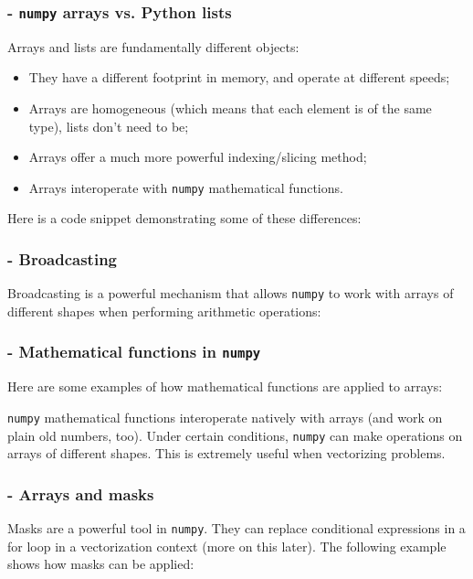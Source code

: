 \subsubsection{- \texttt{numpy} arrays vs. Python lists}
Arrays and lists are fundamentally different objects:
\begin{itemize}
    \item[-] They have a different footprint in memory, and operate at different speeds;
    \item[-] Arrays are homogeneous (which means that each element is of the same type), lists don't need to be;
    \item[-] Arrays offer a much more powerful indexing/slicing method;
    \item[-] Arrays interoperate with \texttt{numpy} mathematical functions.
\end{itemize}

Here is a code snippet demonstrating some of these differences:



\subsubsection{- Broadcasting}
Broadcasting is a powerful mechanism that allows \texttt{numpy} to work with arrays of different shapes when performing arithmetic operations:



\subsubsection{- Mathematical functions in \texttt{numpy}}
Here are some examples of how mathematical functions are applied to arrays:



\texttt{numpy} mathematical functions interoperate natively with arrays (and work on plain old numbers, too). Under certain conditions, \texttt{numpy} can make operations on arrays of different shapes. This is extremely useful when vectorizing problems.

\subsubsection{- Arrays and masks}
Masks are a powerful tool in \texttt{numpy}. They can replace conditional expressions in a for loop in a vectorization context (more on this later). The following example shows how masks can be applied:


